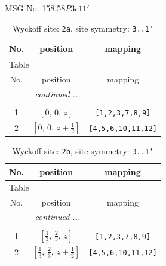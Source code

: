 \documentclass[fleqn,8pt]{jsarticle}
\begin{document}
\setcounter{MaxMatrixCols}{32}

\renewcommand{\tablename}{Table~}
\renewcommand{\figurename}{Figure~}
\begin{center}
\LARGE
MSG No. 158.58\quad$P3c11'$
\end{center}
\renewcommand{\arraystretch}{1.2}
\begin{longtable}{ccc}
\caption{Wyckoff site: {\tt 2a}, site symmetry: {\tt 3..1'}}
 \\
 \hline \hline
No. & position & mapping \\ \hline \endfirsthead

\multicolumn{2}{l}{\tablename\ \thetable{}} \\
 \hline \hline
No. & position & mapping \\ \hline \endhead

 \hline \hline
\multicolumn{2}{r}{\footnotesize\it continued ...} \\ \endfoot

 \hline \hline
\multicolumn{2}{r}{} \\ \endlastfoot

1 & $\left[ 0,\, 0,\, z \right]$ & {\tt [1,2,3,7,8,9]} \\ \hline
2 & $\left[ 0,\, 0,\, z + \frac{1}{2} \right]$ & {\tt [4,5,6,10,11,12]} \\
\end{longtable}
\renewcommand{\arraystretch}{1.2}
\begin{longtable}{ccc}
\caption{Wyckoff site: {\tt 2b}, site symmetry: {\tt 3..1'}}
 \\
 \hline \hline
No. & position & mapping \\ \hline \endfirsthead

\multicolumn{2}{l}{\tablename\ \thetable{}} \\
 \hline \hline
No. & position & mapping \\ \hline \endhead

 \hline \hline
\multicolumn{2}{r}{\footnotesize\it continued ...} \\ \endfoot

 \hline \hline
\multicolumn{2}{r}{} \\ \endlastfoot

1 & $\left[ \frac{1}{3},\, \frac{2}{3},\, z \right]$ & {\tt [1,2,3,7,8,9]} \\ \hline
2 & $\left[ \frac{1}{3},\, \frac{2}{3},\, z + \frac{1}{2} \right]$ & {\tt [4,5,6,10,11,12]} \\
\end{longtable}
\end{document}
